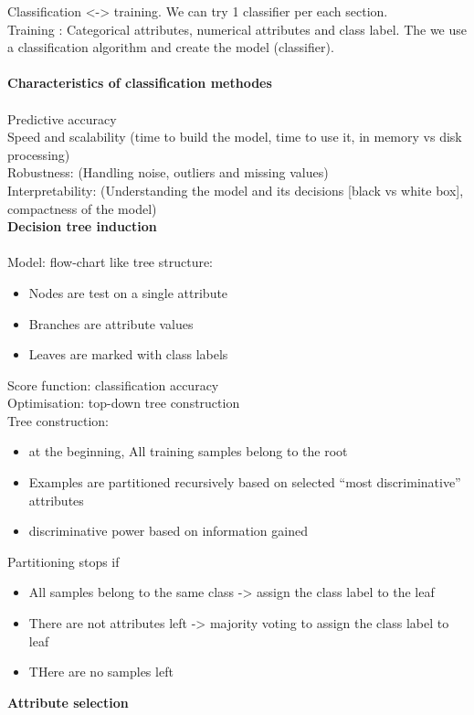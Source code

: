 Classification <-> training. We can try 1 classifier per each section. \\
Training : Categorical attributes, numerical attributes and class label. The we use a classification algorithm and create the model (classifier). \\\\
\textbf{Characteristics of classification methodes} 
\\\\
Predictive accuracy \\
Speed and scalability (time to build the model, time to use it, in memory vs disk processing) \\
Robustness: (Handling noise, outliers and missing values) \\
Interpretability: (Understanding the model and its decisions [black vs white box], compactness of the model) \\
\textbf{Decision tree induction} 
\\\\
Model: flow-chart like tree structure:
\begin{itemize}
 \item Nodes are test on a single attribute
 \item Branches are attribute values
 \item Leaves are marked with class labels
\end{itemize}
Score function: classification accuracy \\
Optimisation: top-down tree construction \\
Tree construction:
\begin{itemize}
 \item at the beginning, All training samples belong to the root
 \item Examples are partitioned recursively based on selected ``most discriminative'' attributes
 \item discriminative power based on information gained
\end{itemize}
Partitioning stops if 
\begin{itemize}
 \item All samples belong to the same class -> assign the class label to the leaf
 \item There are not attributes left -> majority voting to assign the class label to leaf
 \item THere are no samples left
\end{itemize}
\textbf{Attribute selection}
\\\\
